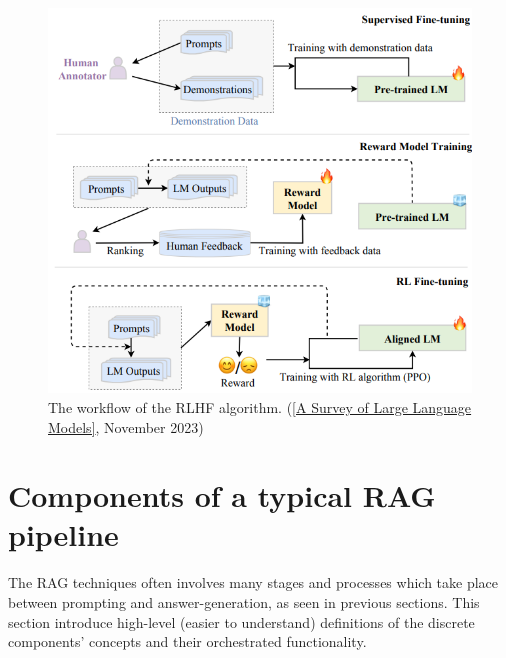 \begin{figure}[htbp]
    \centering
    \includegraphics[width=\linewidth]{./figures/rlhf-workflow.png}
    \caption{The workflow of the RLHF algorithm. (\href{https://arxiv.org/pdf/2303.18223}{[A Survey of Large Language Models]}, November 2023)}
\end{figure}
\newpage

\section{Components of a typical RAG pipeline}
The RAG techniques often involves many stages and processes which take place between prompting and answer-generation, as seen in previous sections.
This section introduce high-level (easier to understand) definitions of the discrete components' concepts and their orchestrated functionality.
\newpage

